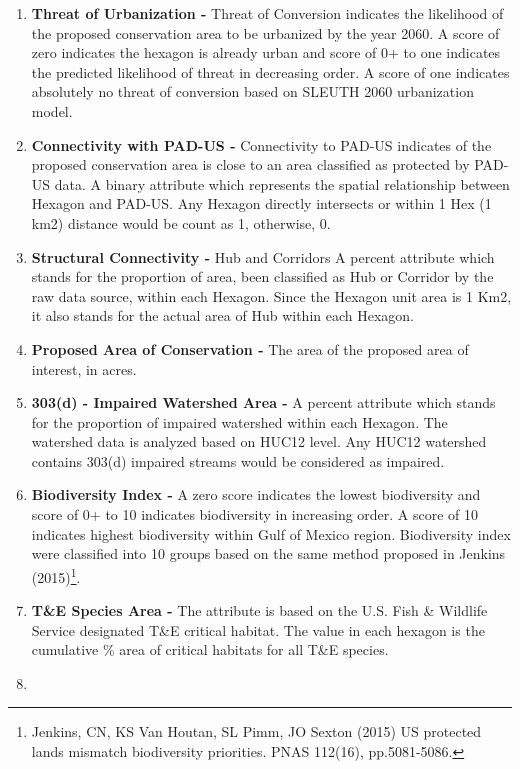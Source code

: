 \documentclass[]{article}
\providecommand{\tightlist}{%
  \setlength{\itemsep}{0pt}\setlength{\parskip}{0pt}}
\let\rmarkdownfootnote\footnote%
\def\footnote{\protect\rmarkdownfootnote}
\begin{document}
\begin{enumerate}
\def\labelenumi{\arabic{enumi}.}
\tightlist
\item
  \textbf{Threat of Urbanization -} Threat of Conversion indicates the
  likelihood of the proposed conservation area to be urbanized by the
  year 2060. A score of zero indicates the hexagon is already urban and
  score of 0+ to one indicates the predicted likelihood of threat in
  decreasing order. A score of one indicates absolutely no threat of
  conversion based on SLEUTH 2060 urbanization model.
\item
  \textbf{Connectivity with PAD-US -} Connectivity to PAD-US indicates
  of the proposed conservation area is close to an area classified as
  protected by PAD-US data. A binary attribute which represents the
  spatial relationship between Hexagon and PAD-US. Any Hexagon directly
  intersects or within 1 Hex (1 km2) distance would be count as 1,
  otherwise, 0.
\item
  \textbf{Structural Connectivity -} Hub and Corridors A percent
  attribute which stands for the proportion of area, been classified as
  Hub or Corridor by the raw data source, within each Hexagon. Since the
  Hexagon unit area is 1 Km2, it also stands for the actual area of Hub
  within each Hexagon.
\item
  \textbf{Proposed Area of Conservation -} The area of the proposed area
  of interest, in acres.
\item
  \textbf{303(d) - Impaired Watershed Area -} A percent attribute which
  stands for the proportion of impaired watershed within each Hexagon.
  The watershed data is analyzed based on HUC12 level. Any HUC12
  watershed contains 303(d) impaired streams would be considered as
  impaired.
\item
  \textbf{Biodiversity Index -} A zero score indicates the lowest
  biodiversity and score of 0+ to 10 indicates biodiversity in
  increasing order. A score of 10 indicates highest biodiversity within
  Gulf of Mexico region. Biodiversity index were classified into 10
  groups based on the same method proposed in Jenkins (2015)\footnote{Jenkins,
    CN, KS Van Houtan, SL Pimm, JO Sexton (2015) US protected lands
    mismatch biodiversity priorities. PNAS 112(16), pp.5081-5086.}.
\item
  \textbf{T\&E Species Area -} The attribute is based on the U.S. Fish
  \& Wildlife Service designated T\&E critical habitat. The value in
  each hexagon is the cumulative \% area of critical habitats for all
  T\&E species.
\item

\end{enumerate}
\end{document}
